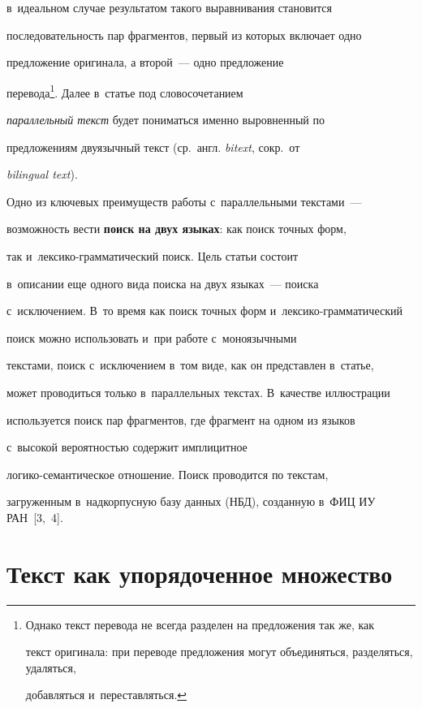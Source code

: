 в~идеальном случае результатом такого выравнивания становится 


последовательность пар фрагментов, первый из которых включает одно 


предложение оригинала, а второй~--- одно предложение 


перевода\footnote{Однако текст перевода не всегда разделен на предложения так же, как 


текст оригинала: при переводе предложения могут объединяться, разделяться, удаляться, 


добавляться и~переставляться.}. Далее в~статье под словосочетанием 


\textit{параллельный текст} будет пониматься именно выровненный по 


предложениям двуязычный текст (ср.\ англ. \textit{bitext}, сокр.\ от 


\textit{bilingual text}).





Одно из ключевых преимуществ работы с~параллельными текстами~--- 


возможность вести \textbf{поиск на двух языках}: как поиск точных форм, 


так и~лек\-си\-ко-грам\-ма\-ти\-че\-ский поиск. Цель статьи состоит 


в~описании еще одного вида поиска на двух языках~--- поиска 


с~исключением. В~то время как поиск точных форм и~лек\-си\-ко-грам\-ма\-ти\-че\-ский 


поиск мож\-но использовать и~при работе с~моноязычными 


текстами, поиск с~исключением в~том виде, как он пред\-став\-лен в~статье, 


может проводиться только в~параллельных текс\-тах. В~качестве ил\-люст\-ра\-ции 


используется поиск пар фрагментов, где фрагмент на одном из языков 


с~высокой вероятностью содержит имплицитное  


ло\-ги\-ко-се\-ман\-ти\-че\-ское отношение. Поиск проводится по текс\-там, 


загруженным в~надкорпусную базу данных (НБД), созданную в~ФИЦ ИУ РАН~[3,~4].





\section{Текст как упорядоченное множество}






